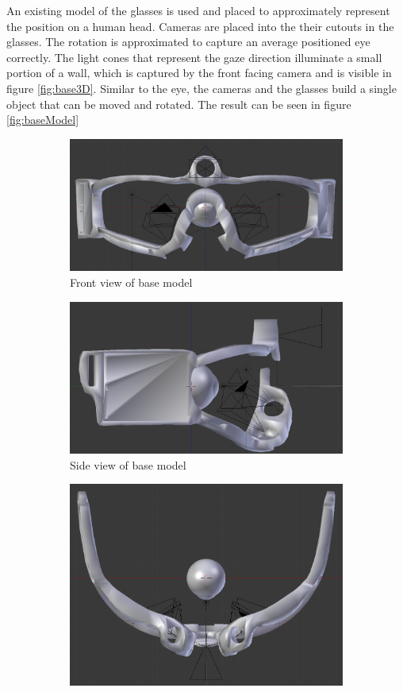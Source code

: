 An existing model of the glasses is used and placed to approximately represent the position on a human head. Cameras are placed into the their cutouts in the glasses. The rotation is approximated to capture an average positioned eye correctly. The light cones that represent the gaze direction illuminate a small portion of a wall, which is captured by the front facing camera and is visible in figure \ref{fig:base3D}. Similar to the eye, the cameras and the glasses build a single object that can be moved and rotated. The result can be seen in figure \ref{fig:baseModel}
\begin{figure}
	\begin{subfigure}{.5\textwidth}
		\centering
		\includegraphics[width=0.9\linewidth]{images/base_model_front.png}
		\caption{Front view of base model}
		\label{fig:baseFront}
	\end{subfigure}
	\begin{subfigure}{.5\textwidth}
		\centering
		\includegraphics[width=0.787\linewidth]{images/base_model_side.png}
		\caption{Side view of base model}
		\label{fig:baseSide}
	\end{subfigure}
	\begin{subfigure}{.5\textwidth}
		\centering
		\includegraphics[width=0.9\linewidth]{images/base_model_bottom.png}

\end{subfigure}
\end{figure}
